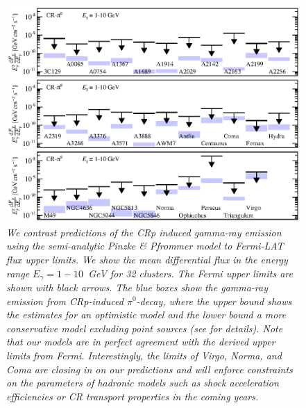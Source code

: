 \documentclass[10pt,aps,pra,reprint,amsmath,amsfonts,amssymb,showpacs,nofootinbib,floatfix]{revtex4-1}
\begin{document}
\begin{figure}
\begin{minipage}{2.0\columnwidth}
  \includegraphics[width=0.99\columnwidth]{figures/Fermi.comp.CR.diff.eps}
  \caption{\it We contrast predictions of the CRp induced gamma-ray
    emission using the semi-analytic Pinzke \& Pfrommer model
    \cite{2010MNRAS.409..449P} to Fermi-LAT flux upper limits. We show
    the mean differential flux in the energy range $E_\gamma=1-10$~GeV
    for 32 clusters. The Fermi upper limits are shown with black
    arrows. The blue boxes show the gamma-ray emission from
    CRp-induced $\pi^0$-decay, where the upper bound shows the
    estimates for an optimistic model and the lower bound a more
    conservative model excluding point sources (see
    \cite{2010MNRAS.409..449P} for details). Note that our models are
    in perfect agreement with the derived upper limits from
    Fermi. Interestingly, the limits of Virgo, Norma, and Coma are
    closing in on our predictions and will enforce constraints on the
    parameters of hadronic models such as shock acceleration
    efficiencies or CR transport properties in the coming years.}
 \label{fig15}
\end{minipage}
\end{figure}
\end{document}
